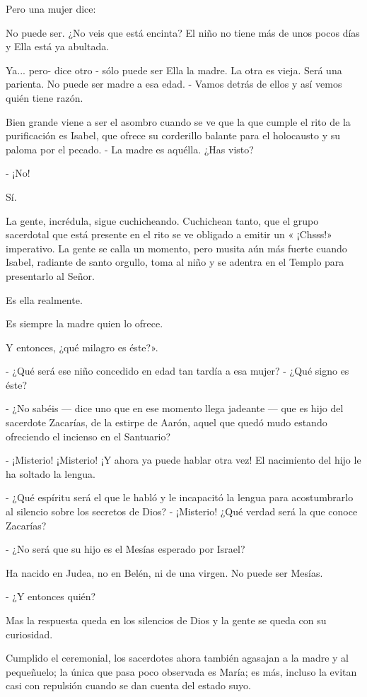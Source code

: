 \documentclass[12pt]{book} %
\begin{document}
Pero una mujer dice: 

No puede ser. ¿No veis que está encinta? El niño no tiene más de unos pocos días y Ella está ya abultada. 

Ya... pero- dice otro - sólo puede ser Ella la madre. La otra es vieja. Será una parienta. No puede ser madre a esa edad. - Vamos detrás de ellos y así vemos quién tiene razón. 

Bien grande viene a ser el asombro cuando se ve que la que cumple el rito de la purificación es Isabel, que ofrece su corderillo balante para el holocausto y su paloma por el pecado. - La madre es aquélla. ¿Has visto? 

- ¡No! 

Sí. 

La gente, incrédula, sigue cuchicheando. Cuchichean tanto, que el grupo sacerdotal que está presente en el rito se ve obligado a emitir un « ¡Chsss!» imperativo. La gente se calla un momento, pero musita aún más fuerte cuando Isabel, radiante de santo orgullo, toma al niño y se adentra en el Templo para presentarlo al Señor. 

Es ella realmente. 

Es siempre la madre quien lo ofrece. 

Y entonces, ¿qué milagro es éste?». 

- ¿Qué será ese niño concedido en edad tan tardía a esa mujer? - ¿Qué signo es éste? 

- ¿No sabéis — dice uno que en ese momento llega jadeante — que es hijo del sacerdote Zacarías, de la estirpe de Aarón, aquel que quedó mudo estando ofreciendo el incienso en el Santuario? 

- ¡Misterio! ¡Misterio! ¡Y ahora ya puede hablar otra vez! El nacimiento del hijo le ha soltado la lengua. 

- ¿Qué espíritu será el que le habló y le incapacitó la lengua para acostumbrarlo al silencio sobre los secretos de Dios? - ¡Misterio! ¿Qué verdad será la que conoce Zacarías? 

- ¿No será que su hijo es el Mesías esperado por Israel? 

Ha nacido en Judea, no en Belén, ni de una virgen. No puede ser Mesías. 

- ¿Y entonces quién? 

Mas la respuesta queda en los silencios de Dios y la gente se queda con su curiosidad. 

Cumplido el ceremonial, los sacerdotes ahora también agasajan a la madre y al pequeñuelo; la única que pasa poco observada es María; es más, incluso la evitan casi con repulsión cuando se dan cuenta del estado suyo. 
\end{document}

